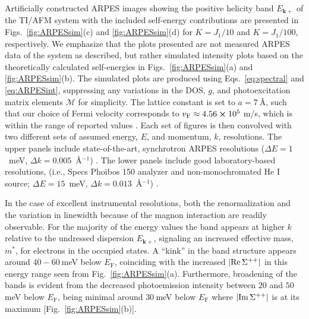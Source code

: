 \documentclass[aps, prb, twocolumn,amsmath,amssymb,floatfix]{revtex4-2}
\begin{document}
Artificially constructed ARPES images showing the positive helicity band $E_{\boldsymbol{k}+}$ of the TI/AFM system with the included self-energy contributions are presented in Figs.~\ref{fig:ARPESsim}(c) and \ref{fig:ARPESsim}(d) for $K=J_{1}/10$ and $K=J_{1}/100$, respectively. 
We emphasize that the plots presented are not measured ARPES data of the system as described, but rather simulated intensity plots based on the theoretically calculated self-energies in Figs.~\ref{fig:ARPESsim}(a) and \ref{fig:ARPESsim}(b).
The simulated plots are produced using Eqs.~\eqref{eq:spectral} and \eqref{eq:ARPESint}, suppressing any variations in the DOS, $g$, and photoexcitation matrix elements $\mathcal{M}$ for simplicity. 
The lattice constant is set to $a = 7~${\AA}, such that our choice of Fermi velocity corresponds to $v_{\textrm{F}} \approx 4.56 \cross 10^{5}~$m/s, which is within the range of reported values \cite{Brune1, Brune2, GiraudEgger, Hugdal3SCTI, Hugdal5SCTI, EirikTIFMAFM}.
Each set of figures is then convolved with two different sets of assumed energy, $E$, and momentum, $k$, resolutions. The upper panels include state-of-the-art, synchrotron ARPES resolutions ($\Delta{E}=1$~meV, $\Delta{k}=0.005$~\AA$^{-1}$) \cite{Borisenko2012one,Rosenzweig2020overdoping,Iwasawa2020high}. The lower panels include good laboratory-based resolutions, (i.e., Specs Phoibos 150 analyzer and non-monochromated He I source; $\Delta E=15$~meV, $\Delta{k} = 0.013$~\AA$^{-1}$) \cite{Tamai2013spin,Rosenzweig2019tuning}.

In the case of excellent instrumental resolutions, both the renormalization and the variation in linewidth because of the magnon interaction are readily observable. For the majority of the energy values the band appears at higher $k$ relative to the undressed dispersion $E_{\boldsymbol{k}+}$, signaling an increased effective mass, $m^{*}$, for electrons in the occupied states. A ``kink'' in the band structure appears around $40-60~$meV below $E_{\text{F}}$, coinciding with the increased $\abs{\Re\Sigma^{++}}$ in this energy range seen from Fig.~\ref{fig:ARPESsim}(a). Furthermore, broadening of the bands is evident from the decreased photoemission intensity between $20$ and $50~$meV below $E_{\text{F}}$, being minimal around $30~$meV below $E_{\text{F}}$ where $\abs{\Im\Sigma^{++}}$ is at its maximum [Fig.~\ref{fig:ARPESsim}(b)].
\end{document}
